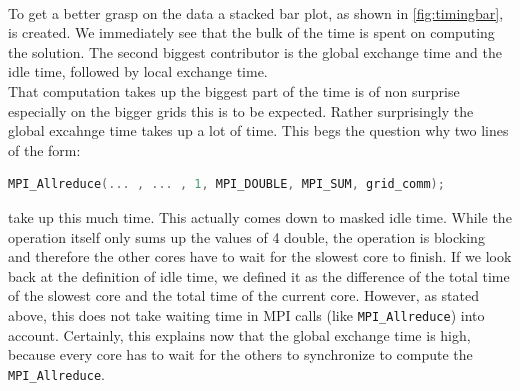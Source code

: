\\
To get a better grasp on the data a stacked bar plot, as shown in \autoref{fig:timingbar}, is created. We immediately see that the bulk of the time is spent on computing the solution. The second biggest contributor is the global exchange time and the idle time, followed by local exchange time.\\
That computation takes up the biggest part of the time is of non surprise especially on the bigger grids this is to be expected. Rather surprisingly the global excahnge time takes up a lot of time. This begs the question why two lines of the form:
\begin{lstlisting}[language=c]
MPI_Allreduce(... , ... , 1, MPI_DOUBLE, MPI_SUM, grid_comm);
\end{lstlisting}
take up this much time. This actually comes down to masked idle time. While the operation itself only sums up the values of 4 double, the operation is blocking and therefore the other cores have to wait for the slowest core to finish. If we look back at the definition of idle time, we defined it as the difference of the total time of the slowest core and the total time of the current core. However, as stated above, this does not take waiting time in MPI calls (like \texttt{MPI\_Allreduce}) into account. Certainly, this explains now that the global exchange time is high, because every core has to wait for the others to synchronize to compute the \texttt{MPI\_Allreduce}.\\
